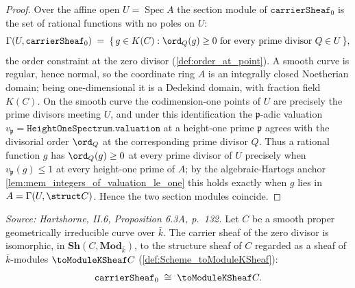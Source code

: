 \begin{proof}
  Over the affine open \(U = \operatorname{Spec} A\) the section module of
  \(\texttt{carrierSheaf}_0\) is the set of rational functions with no poles on
  \(U\):
  \[
    \Gamma(U, \texttt{carrierSheaf}_0) \;=\;
    \{\, g \in K(C) : \ord_Q(g) \geq 0 \text{ for every prime divisor }
    Q \in U \,\},
  \]
  the order constraint at the zero divisor (\cref{def:order_at_point}). A smooth
  curve is regular, hence normal, so the coordinate ring \(A\) is an integrally
  closed Noetherian domain; being one-dimensional it is a Dedekind domain, with
  fraction field \(K(C)\). On the smooth curve the codimension-one points of
  \(U\) are precisely the prime divisors meeting \(U\), and under this
  identification the \(\mathfrak p\)-adic valuation
  \(v_{\mathfrak p} = \texttt{HeightOneSpectrum.valuation}\) at a height-one
  prime \(\mathfrak p\) agrees with the divisorial order \(\ord_Q\) at the
  corresponding prime divisor \(Q\). Thus a rational function \(g\) has
  \(\ord_Q(g) \ge 0\) at every prime divisor of \(U\) precisely when
  \(v_{\mathfrak p}(g) \le 1\) at every height-one prime of \(A\); by the
  algebraic-Hartogs anchor \cref{lem:mem_integers_of_valuation_le_one} this
  holds exactly when \(g\) lies in \(A = \Gamma(U, \struct C)\). Hence the two
  section modules coincide.
\end{proof}

\begin{lemma}
  \label{lem:carrierSheaf_zero_iso_toModuleKSheaf}
  \textit{Source: Hartshorne, II.6, Proposition 6.3A, p.~132.}
  Let \(C\) be a smooth proper geometrically irreducible curve over \(\bar k\).
  The carrier sheaf of the zero divisor is isomorphic, in
  \(\mathbf{Sh}(C, \mathbf{Mod}_{\bar k})\), to the structure sheaf of \(C\)
  regarded as a sheaf of \(\bar k\)-modules \(\toModuleKSheaf C\)
  (\cref{def:Scheme_toModuleKSheaf}):
  \[
    \texttt{carrierSheaf}_0 \;\cong\; \toModuleKSheaf C.
  \]
\end{lemma}


